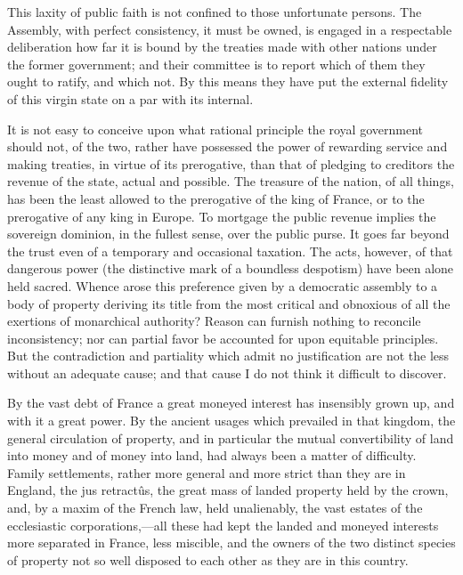 This laxity of public faith is not confined to those unfortunate persons. The Assembly, with perfect consistency, it must be owned, is engaged in a respectable deliberation how far it is bound by the treaties made with other nations under the former government; and their committee is to report which of them they ought to ratify, and which not. By this means they have put the external fidelity of this virgin state on a par with its internal.

It is not easy to conceive upon what rational principle the royal government should not, of the two, rather have possessed the power of rewarding service and making treaties, in virtue of its prerogative, than that of pledging to creditors the revenue of the state, actual and possible. The treasure of the nation, of all things, has been the least allowed to the prerogative of the king of France, or to the prerogative of any king in Europe. To mortgage the public revenue implies the sovereign dominion, in the fullest sense, over the public purse. It goes far beyond the trust even of a temporary and occasional taxation. The acts, however, of that dangerous power (the distinctive mark of a boundless despotism) have been alone held sacred. Whence arose this preference given by a democratic assembly to a body of property deriving its title from the most critical and obnoxious of all the exertions of monarchical authority? Reason can furnish nothing to reconcile inconsistency; nor can partial favor be accounted for upon equitable principles. But the contradiction and partiality which admit no justification are not the less without an adequate cause; and that cause I do not think it difficult to discover.

By the vast debt of France a great moneyed interest has insensibly grown up, and with it a great power. By the ancient usages which prevailed in that kingdom, the general circulation of property, and in particular the mutual convertibility of land into money and of money into land, had always been a matter of difficulty. Family settlements, rather more general and more strict than they are in England, the jus retractûs, the great mass of landed property held by the crown, and, by a maxim of the French law, held unalienably, the vast estates of the ecclesiastic corporations,—all these had kept the landed and moneyed interests more separated in France, less miscible, and the owners of the two distinct species of property not so well disposed to each other as they are in this country.

